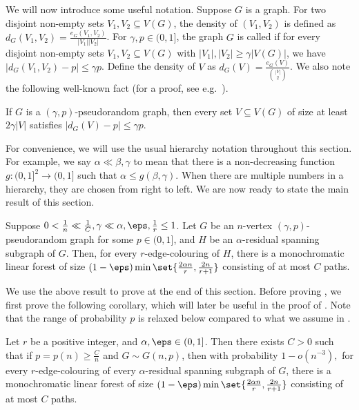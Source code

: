 \documentclass[10pt,a4paper,reqno]{amsart}
\begin{document}
We will now introduce some useful notation. Suppose $G$ is a graph. For two disjoint non-empty sets $V_1,V_2\subseteq V(G)$, the density of $(V_1,V_2)$ is defined as $d_G(V_1,V_2) = \frac{e_G(V_1,V_2)}{|V_1||V_2|}$. For $\gamma, p\in (0,1]$, the graph $G$ is called  if for every disjoint non-empty sets $V_1,V_2\subseteq V(G)$ with $|V_1|,|V_2|\ge \gamma |V(G)|$, we have $|d_G(V_1,V_2)-p|\le \gamma p$. Define the density of $V$ as $d_G(V) = \frac{e_G(V)}{\binom{|V|}{2}}$. We also note the following well-known fact (for a proof, see e.g.~\cite[Section~3]{Gishboliner2021colourbiased}). 
\begin{lemma}
\label{lem:pseudorandomness on single set}
    If $G$ is a $(\gamma, p)$-pseudorandom graph, then every set $V\subseteq V(G)$ of size at least $2\gamma |V|$ satisfies $|d_G(V) -p| \le \gamma p$.
\end{lemma}

For convenience, we will use the usual hierarchy notation throughout this section. For example, we say $\alpha \ll \beta, \gamma$ to mean that there is a non-decreasing function $g:(0,1]^2 \rightarrow (0,1]$ such that $\alpha \le g(\beta,\gamma)$. When there are multiple numbers in a hierarchy, they are chosen from right to left. We are now ready to state the main result of this section.

\begin{theorem} \label{thm:large monochromatic linear forest}
  Suppose $0 < \frac{1}{n} \ll \frac{1}{C}, \gamma \ll \alpha, \eps, \frac{1}{r} \le 1$. Let $G$ be an $n$-vertex $(\gamma,p)$-pseudorandom graph for some $p\in (0,1]$, and $H$ be an $\alpha$-residual spanning subgraph of $G$. Then, for every $r$-edge-colouring of $H$, there is a monochromatic linear forest of size $(1-\eps)\min\set{\frac{2\alpha n}{r}, \frac{2n}{r+1}}$ consisting of at most $C$ paths.
\end{theorem}

We use the above result to prove  at the end of this section. Before proving , we first prove the following corollary, which will later be useful in the proof of . Note that the range of probability $p$ is relaxed below compared to what we assume in . 

\begin{corollary} \label{cor:random graph large monochromatic linear forest}
Let $r$ be a positive integer, and $\alpha, \eps \in (0,1]$. Then there exists $C >0$ such that if $p =  p(n) \ge \frac{C}{n}$ and $G \sim G(n,p)$, then with probability $1-o(n^{-3}),$ for every $r$-edge-colouring of every $\alpha$-residual spanning subgraph of $G$, there is a monochromatic linear forest of size  $(1-\eps)\min\set{\frac{2\alpha n}{r}, \frac{2n}{r+1}}$ consisting of at most $C$ paths. 
\end{corollary}
\end{document}
